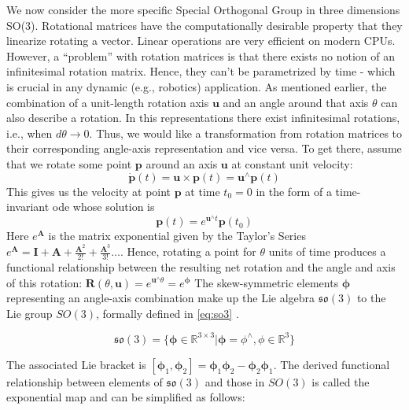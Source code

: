 \documentclass[headsepline, hidelinks, footsepline, footinclude=false, oneside, fontsize=11pt, paper=a4, listof=totoc, bibliography=totoc]{scrbook}
\begin{document}
We now consider the more specific Special Orthogonal Group in three dimensions SO(3).
Rotational matrices have the computationally desirable property that they linearize rotating a vector. Linear operations are very efficient on modern CPUs.
However, a ``problem'' with rotation matrices is that there exists no notion of an infinitesimal rotation matrix. Hence, they can't be parametrized by time - which is crucial in any dynamic (e.g., robotics) application.
As mentioned earlier, the combination of a unit-length rotation axis \(\mathbf{u}\) and an angle around that axis \(\theta\) can also describe a rotation.
In this representations there exist infinitesimal rotations, i.e., when \(d\theta \rightarrow 0\).
Thus, we would like a transformation from rotation matrices to their corresponding angle-axis representation and vice versa.
To get there, assume that we rotate some point \(\mathbf{p}\) around an axis \(\mathbf{u}\) at constant unit velocity:
\begin{equation}
\mathbf{\dot{p}}(t) = \mathbf{u} \times \mathbf{p}(t) = \mathbf{u}^\wedge \mathbf{p}(t)
\end{equation}
This gives us the velocity at point \(\mathbf{p}\) at time \(t_0=0\) in the form of a time-invariant \gls{ode} whose solution is 
\begin{equation}
\mathbf{p}(t) = e^{\mathbf{u}^{\wedge}t}\mathbf{p}(t_0)
\end{equation}
Here \(e^\mathbf{A}\) is the matrix exponential given by the Taylor's Series \(e^\mathbf{A} = \mathbf{I} + \mathbf{A} + \frac{\mathbf{A}^2}{2!} + \frac{\mathbf{A}^3}{3!} \dots\).
Hence, rotating a point for \(\theta\) units of time produces a functional relationship between the resulting net rotation and the angle and axis of this rotation:
\(\mathbf{R}(\theta, \mathbf{u}) = e^{\mathbf{u}^{\wedge}\theta} = e^{\boldsymbol{\phi}}\)
The skew-symmetric elements \(\boldsymbol{\phi}\) representing an angle-axis combination make up the Lie algebra \(\mathfrak{so}(3)\) to the Lie group \(SO(3)\), 
formally defined in \cref{eq:so3} \cite{murrayMathematicalIntroductionRobotic1994}.

\begin{equation}
\label{eq:so3}
\mathfrak{so}(3) =\{\boldsymbol{\phi} \in \mathbb{R}^{3\times3} | \boldsymbol{\phi} = \phi^\wedge, \phi \in \mathbb{R}^3 \}
\end{equation}

The associated Lie bracket is \([\boldsymbol{\phi}_1, \boldsymbol{\phi}_2] = \boldsymbol{\phi}_1\boldsymbol{\phi}_2 - \boldsymbol{\phi}_2\boldsymbol{\phi}_1\).
The derived functional relationship between elements of \(\mathfrak{so}(3)\) and those in \(SO(3)\) is called the exponential map and can be simplified as follows: 
\end{document}
